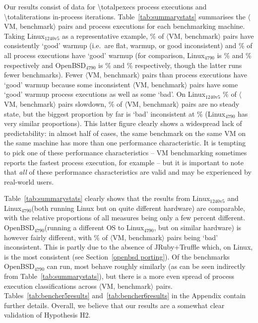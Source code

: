 \documentclass[acmsmall,screen]{acmart}
\newcommand{\hyptwo}{H2\xspace}
\newcommand{\bencherfive}{Linux$_\mathrm{4790}$\xspace}
\newcommand{\benchersix}{OpenBSD$_\mathrm{4790}$\xspace}
\newcommand{\bencherseven}{Linux$_\mathrm{1240v5}$\xspace}
\newcommand{\vmbpair}{$\langle$VM, benchmark$\rangle$\xspace}
\begin{document}
Our results consist of data for \num{\totalpexecs} process executions and \num{\totaliterations} in-process
iterations. Table~\ref{tab:summarystats} summarises the \vmbpair pairs
and process executions for each benchmarking machine. Taking \bencherseven
as a representative example,
\bsevenresult\% of \vmbpair pairs have consistently `good' warmup (i.e.~are flat, warmup,
or good inconsistent) and
%
\result\% of all process executions have `good' warmup (for comparison, \bencherfive
is
\bfiveresult\% and
%
\result\% respectively and \benchersix is
\bsixresult\% and
%
\result\% respectively, though the latter runs fewer benchmarks).
Fewer \vmbpair pairs than process executions have `good'
warmup because some inconsistent \vmbpair pairs have some `good' warmup
process executions as well as some `bad'. On \bencherseven
\benchersevenvmbenchpairsslowdownpercentage\% of \vmbpair pairs slowdown,
\benchersevenvmbenchpairsnosteadystatepercentage\% of \vmbpair pairs are no steady state,
but the biggest proportion by far is `bad' inconsistent at \benchersevenvmbenchpairsbadinconsistentpercentage\%
(\bencherfive has very similar proportions). This latter figure clearly shows a
widespread lack of predictability: in almost half of cases, the same benchmark
on the same VM on the same machine has more than one performance characteristic.
It is tempting to pick one of these performance characteristics -- VM
benchmarking sometimes reports the fastest process execution, for example -- but
it is important to note that \emph{all} of these performance characteristics are
valid and may be experienced by real-world users.

Table~\ref{tab:summarystats} clearly shows that the results from \bencherseven
and \bencherfive (both running Linux but on quite different hardware) are
comparable, with the relative proportions of all measures being only a few
percent different. \benchersix (running a different OS to \bencherfive, but on similar hardware)
is however fairly different, with \benchersixvmbenchpairsbadinconsistentpercentage\%
of \vmbpair pairs being `bad' inconsistent. This is partly due to the absence of
JRuby+Truffle which, on Linux, is the most consistent
(see Section~\ref{openbsd porting}). Of the benchmarks \benchersix can run, most behave
roughly similarly (as can be seen indirectly from Table~\ref{tab:summarystats}), but
there is a more even spread of process execution classifications across \vmbpair pairs.
Tables~\ref{tab:bencher5results} and~\ref{tab:bencher6results} in the Appendix
contain further details. Overall, we believe that our results are a
somewhat clear validation of Hypothesis \hyptwo.
\end{document}
